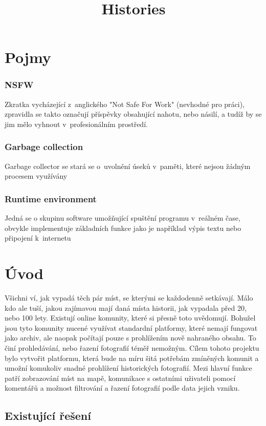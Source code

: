 \documentclass[12pt, a4paper,
  oneside,      %
]{report}
\title{Histories} %
\author{\name} %
\date{\publicationYear} %
\begin{document}
\pagestyle{empty}



\chapter{Pojmy}
\subsection{NSFW}
Zkratka vycházející z~anglického "Not Safe For Work" (nevhodné pro práci), zpravidla se takto označují příspěvky obsahující nahotu, nebo násilí, a tudíž by se jim mělo vyhnout v~profesionálním prostředí. \cite{NSFW}

\subsection{Garbage collection} Garbage collector se stará se o~uvolnění úseků v~paměti, které nejsou žádným procesem využívány \cite{GarbageCollection}

\subsection{Runtime environment} Jedná se o skupinu software umožňující spuštění programu v~reálném čase, obvykle implementuje základních funkce jako je například výpis textu nebo připojení k~internetu \cite{whatIsRuntimeEnvironment}


\chapter{Úvod}
Všichni ví, jak vypadá těch pár míst, se kterými se každodenně setkávají. Málo kdo ale tuší, jakou zajímavou mají daná místa historii, jak vypadala před 20, nebo 100 lety. Existují online komunity, které si přesně toto uvědomují. Bohužel jsou tyto komunity nucené využívat standardní platformy, které nemají fungovat jako archiv, ale naopak počítají pouze s prohlížením nově nahraného obsahu. To činí prohledávání, nebo řazení fotografií téměř nemožným. Cílem tohoto projektu bylo vytvořit platformu, která bude na míru šitá potřebám zmíněných komunit a umožní komukoliv snadné prohlížení historických fotografií. Mezi hlavní funkce patří zobrazování míst na mapě, komunikace s ostatními uživateli pomocí komentářů a možnost filtrování a řazení fotografií podle data jejich vzniku.


\section{Existující řešení}
\end{document}
